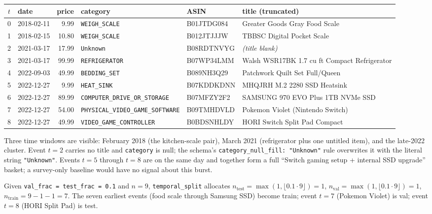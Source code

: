 \documentclass[11pt,a4paper]{article}
\begin{document}
\begin{center}\small
\begin{longtable}{@{}c l r l l p{}@{}}
\toprule
$t$ & date & price & category & ASIN & title (truncated) \\
\midrule\endhead
0 & 2018-02-11 &  9.99 & \texttt{WEIGH\_SCALE}                & B01JTDG084 & Greater Goods Gray Food Scale \\
1 & 2018-02-15 & 10.80 & \texttt{WEIGH\_SCALE}                & B012JTJJJW & TBBSC Digital Pocket Scale \\
2 & 2021-03-17 & 17.99 & \texttt{Unknown}                     & B08RDTNVYG & \emph{(title blank)} \\
3 & 2021-03-17 & 99.99 & \texttt{REFRIGERATOR}                & B07WP34LMM & Walsh WSR17BK 1.7 cu ft Compact Refrigerator \\
4 & 2022-09-03 & 49.99 & \texttt{BEDDING\_SET}                & B089NH3Q29 & Patchwork Quilt Set Full/Queen \\
5 & 2022-12-27 &  9.99 & \texttt{HEAT\_SINK}                  & B07KDDKDNN & MHQJRH M.2 2280 SSD Heatsink \\
6 & 2022-12-27 & 89.99 & \texttt{COMPUTER\_DRIVE\_OR\_STORAGE}& B07MFZY2F2 & SAMSUNG 970 EVO Plus 1TB NVMe SSD \\
7 & 2022-12-27 & 54.00 & \texttt{PHYSICAL\_VIDEO\_GAME\_SOFTWARE}& B09TMHDVLD & Pokemon Violet (Nintendo Switch) \\
8 & 2022-12-27 & 49.99 & \texttt{VIDEO\_GAME\_CONTROLLER}     & B0BDSNHLDY & HORI Switch Split Pad Compact \\
\bottomrule
\end{longtable}
\end{center}

Three time windows are visible: February 2018 (the kitchen-scale pair),
March 2021 (refrigerator plus one untitled item), and the late-2022
cluster. Event $t = 2$ carries no title and \texttt{category} is null;
the schema's \texttt{category\_null\_fill: "Unknown"} rule overwrites it
with the literal string \verb|"Unknown"|. Events $t = 5$ through $t = 8$
are on the same day and together form a full ``Switch gaming setup +
internal SSD upgrade'' basket; a survey-only baseline would have no
signal about this burst.

Given \texttt{val\_frac = test\_frac = 0.1} and $n = 9$,
\texttt{temporal\_split} allocates
$n_{\text{test}} = \max(1, \lfloor 0.1 \cdot 9\rfloor) = 1$,
$n_{\text{val}} = \max(1, \lfloor 0.1 \cdot 9\rfloor) = 1$,
$n_{\text{train}} = 9 - 1 - 1 = 7$. The seven earliest events (food
scale through Samsung SSD) become train; event $t = 7$ (Pokemon Violet)
is val; event $t = 8$ (HORI Split Pad) is test.
\end{document}
